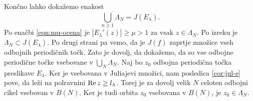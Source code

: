 \noindent Končno lahko dokažemo enakost
\[\overline{\bigcup_{n \geq 1} \Lambda_N} = J (E_\lambda).\]
Po enačbi \eqref{eqn:mu-ocena} je \(|E_\lambda' (z)| \geq \mu > 1\) za vsak \(z \in \Lambda_N\). Po izreku  je \(\Lambda_N \subset J (E_\lambda)\). Po drugi strani pa vemo, da je \(J (f)\) zaprtje množice vseh odbojnih periodičnih točk. Zato je dovolj, da dokažemo, da so vse odbojne periodične točke vsebovane v \(\bigcup_N \Lambda_N\). Naj bo \(z_0\) odbojna periodična točka preslikave \(E_\lambda\). Ker je vsebovana v Juliajevi množici, nam posledica \ref{cor:jul-e} pove, da leži na polravnini \(\operatorname{Re} z \geq l_\lambda\). Torej je za dovolj velik \(N\) celoten odbojni cikel vsebovan v \(B (N)\). Ker je tudi orbita \(z_0\) vsebovana v \(B (N)\), je \(z_0 \in \Lambda_N\).
